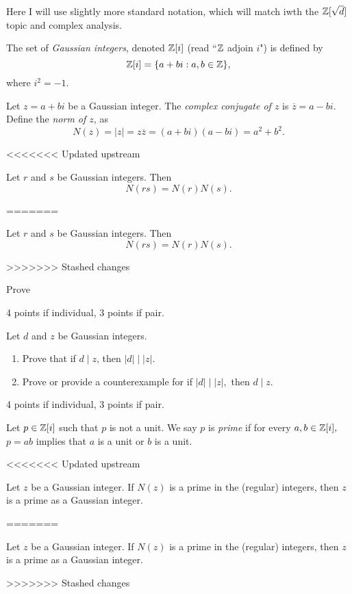 \documentclass[letterpaper, 11 pt,handout]{ximera}
\begin{document}
\begin{exploration}
Here I will use slightly more standard notation, which will match iwth the $\mathbb Z[\sqrt{d}]$ topic and complex analysis.
 	\begin{definition}
 		The set of \emph{Gaussian integers}, denoted $\mathbb Z[i]$ (read ``$\mathbb Z$ adjoin $i$") is defined by 
 \[\mathbb Z[i]=\{a+bi : a,b\in\mathbb Z\},\]
 where $i^2=-1$.
 
 	Let $z=a+bi$ be a Gaussian integer. The \emph{complex  conjugate of $z$} is $\overline{z}=a-bi$. Define the \emph{norm of $z$}, as
 \[N(z)=|z|=z\overline{z}=(a+bi)(a-bi)=a^2+b^2.\]
	\end{definition}

<<<<<<< Updated upstream
\begin{lem*}[Lemma 13.1.4]\label{norm-mult}
 	Let $r$ and $s$ be Gaussian integers. Then 
 		\[N(rs)=N(r)N(s).\]
 \end{lem*}
=======
\begin{lemma}[Lemma 13.1.4]\label{norm-mult}
 	Let $r$ and $s$ be Gaussian integers. Then 
 		\[N(rs)=N(r)N(s).\]
 \end{lemma}
>>>>>>> Stashed changes

\begin{problem}
Prove 
	\begin{rubric}
 		4 points if individual, 3 points if pair.
	\end{rubric}
\end{problem}

\begin{problem}
Let $d$ and $z$ be Gaussian integers. 
\begin{enumerate}
	\item Prove that if $d\mid z$, then $|d|\mid |z|$.
		\item Prove or provide a counterexample for if $|d|\mid |z|,$ then $d\mid z.$ 
\end{enumerate}
	\begin{rubric}
 		4 points if individual, 3 points if pair.
	\end{rubric}
\end{problem}

\begin{definition}
 Let $p\in\mathbb Z[i]$ such that $p$ is not a unit. We say $p$ is \emph{prime} if for every $a,b\in\mathbb Z[i],$ $p=ab$ implies that $a$ is a unit or $b$ is a unit.
\end{definition}

<<<<<<< Updated upstream
\begin{lem*}[Lemma 13.2.6]\label{prime_norm}
 Let $z$ be a Gaussian integer. If $N(z)$ is a prime in the (regular) integers, then $z$ is a prime as a Gaussian integer.
\end{lem*}
=======
\begin{lemma}[Lemma 13.2.6]\label{prime_norm}
 Let $z$ be a Gaussian integer. If $N(z)$ is a prime in the (regular) integers, then $z$ is a prime as a Gaussian integer.
\end{lemma}
>>>>>>> Stashed changes


\end{exploration}
\end{document}
